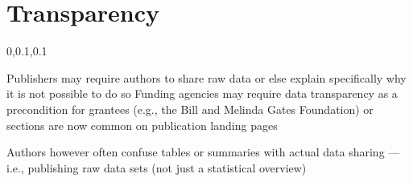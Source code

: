 
\section{Transparency}\fbeg{}\begin{frame}{}

\vspace{-.5em}	

{\Large{}\selectfont

\hspace*{20pt}\begin{minipage}{.96\textwidth}
\vspace{4pt}
		
\begin{lightquadblockc}{0,0.1,0.1}{\parbox{21cm}{\centering \vspace{3pt}}}
\begin{center}\begin{minipage}{\textwidth}
{\Huge \setlength{\leftmargini}{30pt}\begin{enumerate}
\dmitem {\dsp} Publishers may require authors to share raw data or else explain specifically 
why it is not possible to do so 
\vspace{20pt}
\dmitem {\dsp} Funding agencies may require data transparency as a precondition for 
grantees (e.g., the Bill and Melinda Gates Foundation)
\vspace{20pt}
\dmitem {\dsp}  or  sections are now common on 
publication landing pages
\vspace{20pt}
\end{enumerate}
}\end{minipage}
\end{center}
\end{lightquadblockc}
\end{minipage}

}

\vspace{-11pt}
{\thrule}
\hspace{32pt}\begin{minipage}{.8\textwidth}
{\fontsize{19}{25}\selectfont \setlength{\leftmargini}{3pt}
Authors however often confuse tables or summaries with actual data sharing --- %
i.e., publishing raw data sets (not just a statistical overview)

}
\end{minipage}


\end{frame}

